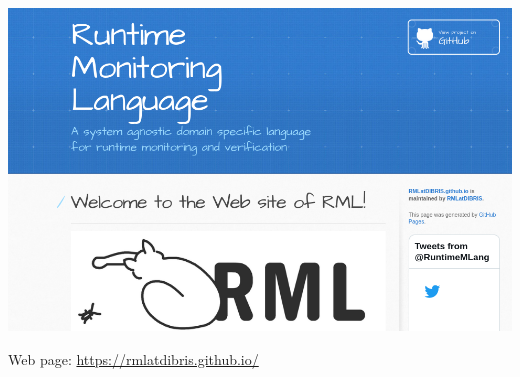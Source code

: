 \documentclass[10pt,usenames,dvipsnames]{beamer}
\begin{document}



\begin{frame}{\rml}
  \begin{center}
    \includegraphics[height=0.7\textheight]{images/rmlweb}
  \end{center}

  \rml Web page: \href{https://rmlatdibris.github.io/}{https://rmlatdibris.github.io/}
\end{frame}
\end{document}
